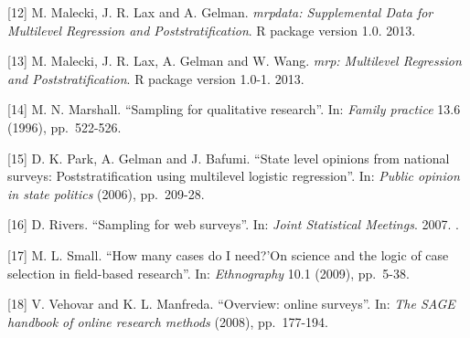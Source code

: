 \documentclass[]{article}
\begin{document}
{[}12{]} M. Malecki, J. R. Lax and A. Gelman. \emph{mrpdata:
Supplemental Data for Multilevel Regression and Poststratification}. R
package version 1.0. 2013.

{[}13{]} M. Malecki, J. R. Lax, A. Gelman and W. Wang. \emph{mrp:
Multilevel Regression and Poststratification}. R package version 1.0-1.
2013.

{[}14{]} M. N. Marshall. ``Sampling for qualitative research''. In:
\emph{Family practice} 13.6 (1996), pp.~522-526.

{[}15{]} D. K. Park, A. Gelman and J. Bafumi. ``State level opinions
from national surveys: Poststratification using multilevel logistic
regression''. In: \emph{Public opinion in state politics} (2006),
pp.~209-28.

{[}16{]} D. Rivers. ``Sampling for web surveys''. In: \emph{Joint
Statistical Meetings}. 2007. .

{[}17{]} M. L. Small. ``How many cases do I need?'On science and the
logic of case selection in field-based research''. In:
\emph{Ethnography} 10.1 (2009), pp.~5-38.

{[}18{]} V. Vehovar and K. L. Manfreda. ``Overview: online surveys''.
In: \emph{The SAGE handbook of online research methods} (2008),
pp.~177-194.
\end{document}
